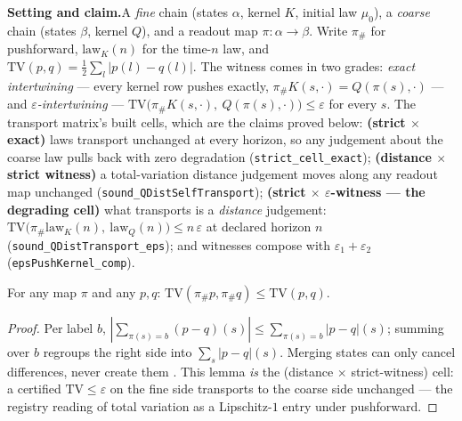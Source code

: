 

\textbf{Setting and claim.}\enspace A \emph{fine} chain (states
$\alpha$, kernel $K$, initial law $\mu_0$), a \emph{coarse} chain
(states $\beta$, kernel $Q$), and a readout map
$\pi : \alpha \to \beta$. Write $\pi_{\#}$ for pushforward,
$\mathrm{law}_K(n)$ for the time-$n$ law, and
$\mathrm{TV}(p, q) = \tfrac12 \sum_l |p(l) - q(l)|$. The witness comes
in two grades: \emph{exact intertwining} --- every kernel row pushes
exactly, $\pi_{\#} K(s, \cdot) = Q(\pi(s), \cdot)$ --- and
\emph{$\varepsilon$-intertwining} ---
$\mathrm{TV}\bigl(\pi_{\#} K(s, \cdot),\ Q(\pi(s), \cdot)\bigr) \leq
\varepsilon$ for every $s$. The transport matrix's built cells, which
are the claims proved below: \textbf{(strict $\times$ exact)} laws
transport unchanged at every horizon, so any judgement about the coarse
law pulls back with zero degradation
(\texttt{strict\_cell\_exact}); \textbf{(distance $\times$ strict
witness)} a total-variation distance judgement moves along any readout
map unchanged (\texttt{sound\_QDistSelfTransport});
\textbf{(strict $\times$ $\varepsilon$-witness --- the degrading
cell)} what transports is a \emph{distance} judgement:
$\mathrm{TV}\bigl(\pi_{\#}\mathrm{law}_K(n),\
\mathrm{law}_Q(n)\bigr) \leq n\,\varepsilon$ at declared horizon $n$
(\texttt{sound\_QDistTransport\_eps}); and witnesses compose with
$\varepsilon_1 + \varepsilon_2$ (\texttt{epsPushKernel\_comp}).

\begin{blemma}
\label{lem:qdt-dpi}
For any map $\pi$ and any $p, q$:
$\mathrm{TV}(\pi_{\#} p, \pi_{\#} q) \leq \mathrm{TV}(p, q)$.
\end{blemma}
\begin{proof}
Per label $b$, $|\sum_{\pi(s) = b} (p - q)(s)| \leq
\sum_{\pi(s) = b} |p - q|(s)$; summing over $b$ regroups the right side
into $\sum_s |p - q|(s)$. Merging states can only cancel differences,
never create them \cite[Ch.~4]{levinperes2017}. This lemma \emph{is}
the (distance $\times$ strict-witness) cell: a certified
$\mathrm{TV} \leq \varepsilon$ on the fine side transports to the
coarse side unchanged --- the registry reading of total variation as a
Lipschitz-$1$ entry under pushforward.
\end{proof}

